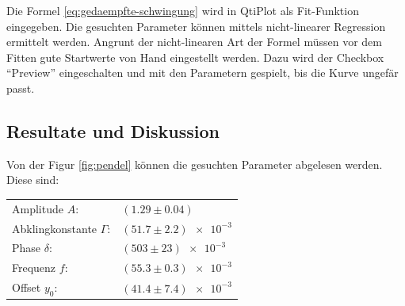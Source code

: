 Die Formel \ref{eq:gedaempfte-schwingung} wird in QtiPlot als Fit-Funktion eingegeben. Die gesuchten
Parameter k\"onnen mittels nicht-linearer Regression ermittelt werden. Angrunt der nicht-linearen Art
der Formel m\"ussen vor dem Fitten gute Startwerte von Hand eingestellt werden. Dazu wird der Checkbox
``Preview'' eingeschalten und mit den Parametern gespielt, bis die Kurve ungef\"ar passt.


\subsection{Resultate und Diskussion}

Von der Figur \ref{fig:pendel} k\"onnen die gesuchten Parameter abgelesen werden. Diese sind:
\begin{center}
    \begin{tabular}{ll}
        Amplitude $A$:              &  $(1.29 \pm 0.04)$         \\
        Abklingkonstante $\Gamma$:  &  $(51.7 \pm 2.2)\num{e-3}$ \\
        Phase $\delta$:             &  $(503  \pm 23) \num{e-3}$ \\
        Frequenz $f$:               &  $(55.3 \pm 0.3)\num{e-3}$ \\
        Offset $y_0$:               &  $(41.4 \pm 7.4)\num{e-3}$ \\
    \end{tabular}
\end{center}

